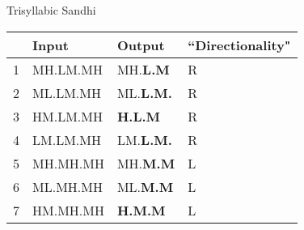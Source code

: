 \documentclass{article}
\begin{document}
\begin{exe}
\ex \label{cd2}
Trisyllabic Sandhi \\
\begin{tabular}[t]{|c|l|l|l|}
\hline
& Input & Output & ``Directionality" \\
\hline
1 & MH.LM.MH & MH.\textbf{L.M} & R \\
\hline
2 & ML.LM.MH & ML.\textbf{L.M.} & R \\
\hline
3 & HM.LM.MH & \textbf{H.L.M} & R \\
\hline
4 & LM.LM.MH & LM.\textbf{L.M.} & R \\
\hline
5 & MH.MH.MH & MH.\textbf{M.M} & L \\
\hline
6 & ML.MH.MH & ML.\textbf{M.M} & L \\
\hline
7 & HM.MH.MH & \textbf{H.M.M} & L \\ 
\hline
\end{tabular}
\end{exe}
\end{document}

